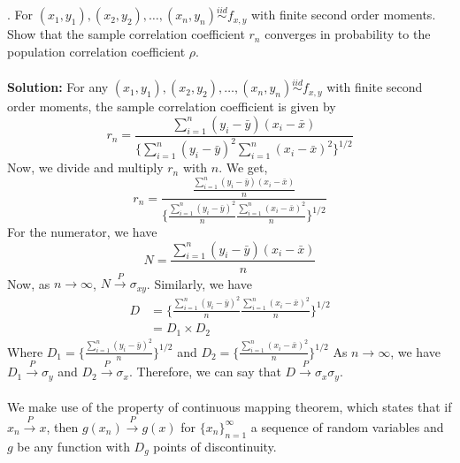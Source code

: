 \documentclass[11pt]{article}
\begin{document}
. For $(x_{1}, y_{1}), (x_{2}, y_{2}), \dots, (x_{n}, y_{n}) \overset{iid} \sim f_{x,y}$ with finite second order moments. Show that the sample correlation coefficient $r_{n}$ converges in probability to the population correlation coefficient $\rho$. \\ \\
\textbf{Solution:} For any $(x_{1}, y_{1}), (x_{2}, y_{2}), \dots, (x_{n}, y_{n}) \overset{iid} \sim f_{x,y}$ with finite second order moments, the sample correlation coefficient is given by
\begin{equation}
  \nonumber
  r_{n} = \frac{\sum_{i = 1}^{n}(y_{i} - \bar{y})(x_{i} - \bar{x})}{\{\sum_{i = 1}^{n}(y_{i} - \bar{y})^{2}\sum_{i = 1}^{n}(x_{i} - \bar{x})^{2}\}^{1/2}}
\end{equation}
Now, we divide and multiply $r_{n}$ with $n$. We get,
\begin{equation}
  \nonumber
    r_{n} = \frac{\frac{\sum_{i = 1}^{n}(y_{i} - \bar{y})(x_{i} - \bar{x})}{n}}{\{\frac{\sum_{i = 1}^{n}(y_{i} - \bar{y})^{2}}{n}\frac{\sum_{i = 1}^{n}(x_{i} - \bar{x})^{2}}{n}\}^{1/2}}
\end{equation}
For the numerator, we have
\begin{equation}
  \nonumber
  N = \frac{\sum_{i = 1}^{n}(y_{i} - \bar{y})(x_{i} - \bar{x})}{n}
\end{equation}
Now, as $n \xrightarrow{} \infty$, $N \xrightarrow{P} \sigma_{xy}$. Similarly, we have
\begin{equation}
  \nonumber
  \begin{aligned}
    D & = \{\frac{\sum_{i = 1}^{n}(y_{i} - \bar{y})^{2}}{n}\frac{\sum_{i = 1}^{n}(x_{i} - \bar{x})^{2}}{n}\}^{1/2}\\
    & = D_{1} \times D_{2}
  \end{aligned}
\end{equation}
Where $D_{1} = \{\frac{\sum_{i = 1}^{n}(y_{i} - \bar{y})^{2}}{n}\}^{1/2}$ and $D_{2} = \{\frac{\sum_{i = 1}^{n}(x_{i} - \bar{x})^{2}}{n}\}^{1/2}$ As $n \xrightarrow{} \infty$, we have $D_{1} \xrightarrow{P} \sigma_{y}$ and $D_{2} \xrightarrow{P} \sigma_{x}$. Therefore, we can say that $D \xrightarrow{P} \sigma_{x}\sigma_{y}$.\\ \\
We make use of the property of continuous mapping theorem, which states that if $x_{n} \xrightarrow{P} x$, then $g(x_{n}) \xrightarrow{P} g(x)$ for $\{x_{n}\}_{n=1}^{\infty}$
a sequence of random variables and $g$ be any function with $D_{g}$ points of discontinuity.\\ \\
\end{document}
